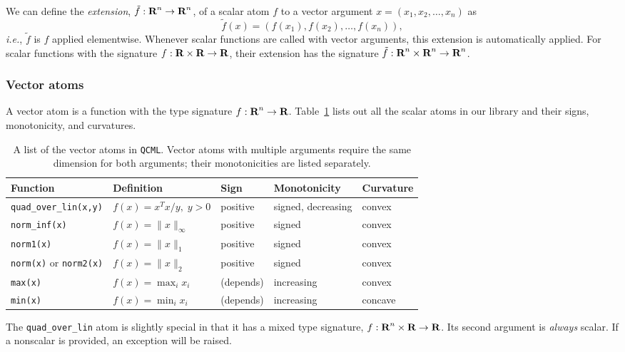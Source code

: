 \documentclass[11pt]{article}
\def\qcml{\texttt{QCML}\xspace}
\newcommand{\ie}{{\it i.e.}}
\newcommand{\reals}{{\mbox{\bf R}}}
\begin{document}
We can define the \emph{extension}, $\tilde f : \reals^n \to \reals^n$,
of a scalar atom $f$ to a vector argument $x = (x_1, x_2, \ldots, x_n)$ as
\[
\tilde f(x) = \left( f(x_1), f(x_2), \ldots, f(x_n) \right),
\]
\ie, $\tilde f$ is $f$ applied elementwise.
Whenever scalar functions are called with vector arguments, this extension
is automatically applied. For scalar functions with the signature
$f : \reals \times \reals \to \reals$, their extension has the signature
$\tilde f : \reals^n \times \reals^n \to \reals^n$.

\subsubsection{Vector atoms}
A vector atom is a function with the type signature $f : \reals^n \to \reals$.
Table~\ref{t-vector-atoms} lists out all the scalar atoms in our library
and their signs, monotonicity, and curvatures.

\begin{table}
  \centering
  \small
  \renewcommand{\arraystretch}{1.5}
  \centering
\begin{tabular}{|l|l||l|l|l|} \hline
  Function & Definition & Sign & Monotonicity & Curvature \\ \hline
  {\tt quad\_over\_lin(x,y)} & $f(x) = x^Tx/y, \; y >0$ & positive & signed, decreasing & convex \\ \hline
  {\tt norm\_inf(x)} & $f(x) = \|x\|_\infty$ & positive & signed & convex \\ \hline
  {\tt norm1(x)} & $f(x) = \|x\|_1$ & positive & signed & convex \\ \hline
  {\tt norm(x)} or {\tt norm2(x)} & $f(x) = \|x\|_2$ & positive & signed & convex \\ \hline
  {\tt max(x)} & $f(x) = \max_i x_i$ & (depends) & increasing & convex \\ \hline
  {\tt min(x)} & $f(x) = \min_i x_i$ & (depends) & increasing & concave \\ \hline
\end{tabular}
\caption{A list of the vector atoms in \qcml. Vector atoms with multiple arguments
require the same dimension for both arguments; their monotonicities are listed separately.}
\label{t-vector-atoms}
\end{table}

The {\tt quad\_over\_lin} atom is slightly special in that it has a mixed
type signature, $f : \reals^n \times \reals \to \reals$. Its second argument
is \emph{always} scalar. If a nonscalar is provided, an exception will be
raised.
\end{document}
